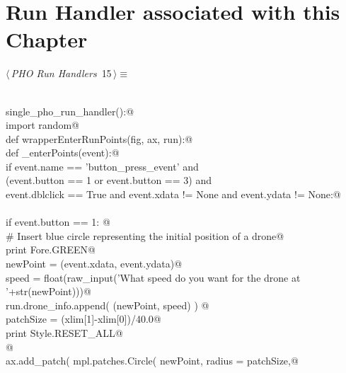 \documentclass[10.0pt]{report}
\begin{document}
\newpage
\section{Run Handler associated with this Chapter}


\begin{flushleft} \small\label{scrap8}\raggedright\small
{} $\langle\,${\itshape PHO Run Handlers}\nobreak\ {\footnotesize {15}}$\,\rangle\equiv$
\vspace{-1ex}
\begin{list}{}{} \item
\mbox{}\verb@@\\
\mbox{}\verb@def single_pho_run_handler():@\\
\mbox{}\verb@    import random@\\
\mbox{}\verb@    def wrapperEnterRunPoints(fig, ax, run):@\\
\mbox{}\verb@      def _enterPoints(event):@\\
\mbox{}\verb@        if event.name      == 'button_press_event'          and \@\\
\mbox{}\verb@           (event.button   == 1 or event.button == 3)       and \@\\
\mbox{}\verb@            event.dblclick == True and event.xdata  != None and event.ydata  != None:@\\
\mbox{}\verb@@\\
\mbox{}\verb@             if event.button == 1:  @\\
\mbox{}\verb@                 # Insert blue circle representing the initial position of a drone@\\
\mbox{}\verb@                 print Fore.GREEN@\\
\mbox{}\verb@                 newPoint = (event.xdata, event.ydata)@\\
\mbox{}\verb@                 speed    = float(raw_input('What speed do you want for the drone at '+str(newPoint)))@\\
\mbox{}\verb@                 run.drone_info.append( (newPoint, speed) ) @\\
\mbox{}\verb@                 patchSize  = (xlim[1]-xlim[0])/40.0@\\
\mbox{}\verb@                 print Style.RESET_ALL@\\
\mbox{}\verb@                 @\\
\mbox{}\verb@                 ax.add_patch( mpl.patches.Circle( newPoint, radius = patchSize,@\\

\end{list}
\end{flushleft}
\end{document}
